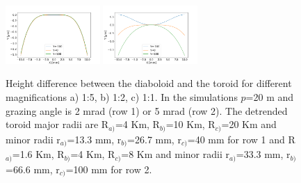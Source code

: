 \documentclass{iucr}              %
\begin{document}
\begin{figure}
\includegraphics[width=0.32\textwidth]{figures/diaboloid_detrended_5mrad_1:2_profile.png}
\includegraphics[width=0.32\textwidth]{figures/diaboloid_detrended_5mrad_1:1_profile.png}

\caption{
Height difference between the diaboloid and the toroid for different magnifications a) 1:5, b) 1:2, c) 1:1. In the simulations $p$=20 m and grazing angle is 2 mrad (row 1) or 5 mrad (row 2). The detrended toroid major radii are R$_{a)}$=4 Km, R$_{b)}$=10 Km, R$_{c)}$=20 Km and minor radii r$_{a)}$=13.3 mm, r$_{b)}$=26.7 mm, r$_{c)}$=40 mm for row 1 and R$_{a)}$=1.6 Km, R$_{b)}$=4 Km, R$_{c)}$=8 Km and minor radii r$_{a)}$=33.3 mm, r$_{b)}$=66.6 mm, r$_{c)}$=100 mm for row 2.
}
\end{figure}

% 
\end{document}

